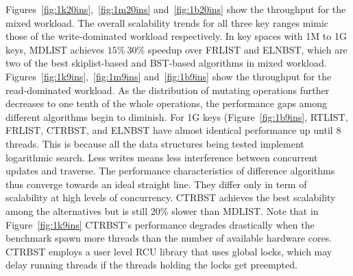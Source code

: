 \documentclass[10pt,conference,compsocconf]{IEEEtran}
\begin{document}
Figures~\ref{fig:1k20ins},~\ref{fig:1m20ins} and~\ref{fig:1b20ins} show the throughput for the mixed workload.
The overall scalability trends for all three key ranges mimic those of the write-dominated workload respectively.
In key spaces with 1M to 1G keys, MDLIST achieves $15\%~30\%$ speedup over FRLIST and ELNBST, which are two of the best skiplist-based and BST-based algorithms in mixed workload.
Figures~\ref{fig:1k9ins},~\ref{fig:1m9ins} and~\ref{fig:1b9ins} show the throughput for the read-dominated workload.
As the distribution of mutating operations further decreases to one tenth of the whole operations, the performance gaps among different algorithms begin to diminish.
For 1G keys (Figure~\ref{fig:1b9ins}, RTLIST, FRLIST, CTRBST, and ELNBST have almost identical performance up until 8 threads.
This is because all the data structures being tested implement logarithmic search.
Less writes means less interference between concurrent updates and traverse.
The performance characteristics of difference algorithms thus converge towards an ideal straight line.
They differ only in term of scalability at high levels of concurrency.
CTRBST achieves the best scalability among the alternatives but is still $20\%$ slower than MDLIST.
Note that in Figure~\ref{fig:1k9ins} CTRBST's performance degrades drastically when the benchmark spawn more threads than the number of available hardware cores.
CTRBST employs a user level RCU library that uses global locks, which may delay running threads if the threads holding the locks get preempted.

\end{document}
